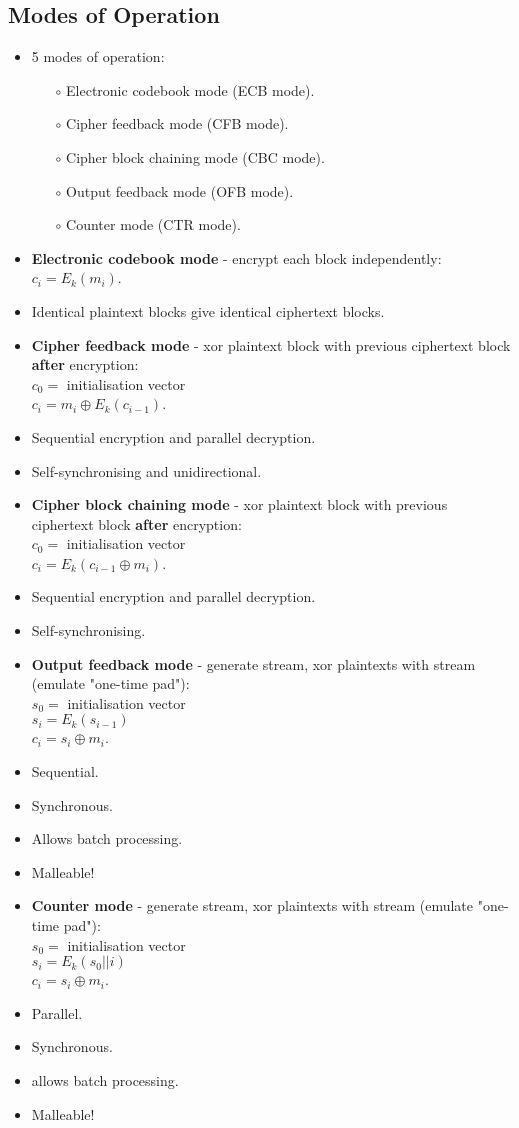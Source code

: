 \documentclass[a4paper]{scrartcl}
\begin{document}
\subsection*{Modes of Operation}
\begin{itemize}
\item 5 modes of operation:
\begin{itemize}
\item [$\circ$] Electronic codebook mode (ECB mode).
\item [$\circ$] Cipher feedback mode (CFB mode).
\item [$\circ$] Cipher block chaining mode (CBC mode).
\item [$\circ$] Output feedback mode (OFB mode).
\item [$\circ$] Counter mode (CTR mode).
\end{itemize}
\item \textbf{Electronic codebook mode} - encrypt each block independently: $c_i = E_k(m_i)$.
\item Identical plaintext blocks give identical ciphertext blocks.
\item \textbf{Cipher feedback mode} - xor plaintext block with previous ciphertext block \textbf{after} encryption:\\$c_0 =$ initialisation vector\\$c_i = m_i \oplus E_k(c_{i-1})$.
\item Sequential encryption and parallel decryption.
\item Self-synchronising and unidirectional.
\item \textbf{Cipher block chaining mode} - xor plaintext block with previous ciphertext block \textbf{after} encryption:\\$c_0 =$ initialisation vector\\$c_i = E_k(c_{i-1} \oplus m_i)$.
\item Sequential encryption and parallel decryption.
\item Self-synchronising.
\item \textbf{Output feedback mode} - generate stream, xor plaintexts with stream (emulate "one-time pad"):\\$s_0 =$ initialisation vector\\$s_i = E_k(s_{i-1})$\\$c_i = s_i \oplus m_i$.
\item Sequential. 
\item Synchronous.
\item Allows batch processing.
\item Malleable!
\item \textbf{Counter mode} - generate stream, xor plaintexts with stream (emulate "one-time pad"):\\$s_0 =$ initialisation vector\\$s_i = E_k(s_{0} || i)$\\$c_i = s_i \oplus m_i$.
\item Parallel.
\item Synchronous.
\item allows batch processing.
\item Malleable!
\end{itemize}
\end{document}
